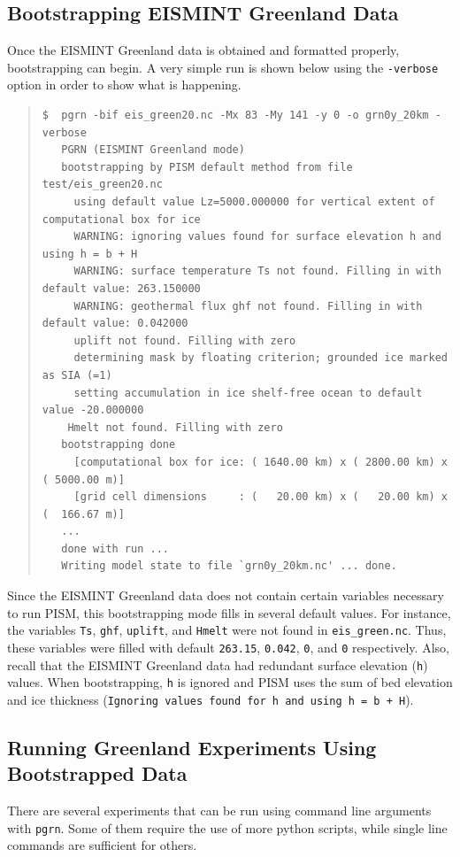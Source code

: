 \documentclass[11pt,final]{amsart}
\begin{document}
\subsection{Bootstrapping EISMINT Greenland Data}  Once the EISMINT Greenland data is obtained and formatted properly, bootstrapping can begin.  A very simple run is shown below using the \verb|-verbose| option in order to show what is happening.

\small\begin{quote}\begin{verbatim}
$  pgrn -bif eis_green20.nc -Mx 83 -My 141 -y 0 -o grn0y_20km -verbose
   PGRN (EISMINT Greenland mode)
   bootstrapping by PISM default method from file test/eis_green20.nc
     using default value Lz=5000.000000 for vertical extent of computational box for ice
     WARNING: ignoring values found for surface elevation h and using h = b + H
     WARNING: surface temperature Ts not found. Filling in with default value: 263.150000
     WARNING: geothermal flux ghf not found. Filling in with default value: 0.042000
     uplift not found. Filling with zero
     determining mask by floating criterion; grounded ice marked as SIA (=1)
     setting accumulation in ice shelf-free ocean to default value -20.000000
    Hmelt not found. Filling with zero
   bootstrapping done
     [computational box for ice: ( 1640.00 km) x ( 2800.00 km) x ( 5000.00 m)]
     [grid cell dimensions     : (   20.00 km) x (   20.00 km) x (  166.67 m)]
   ...
   done with run ... 
   Writing model state to file `grn0y_20km.nc' ... done.

\end{verbatim}
\end{quote}\normalsize

\noindent Since the EISMINT Greenland data does not contain certain variables necessary to run PISM, this bootstrapping mode fills in several default values. For instance, the variables \verb|Ts|, \verb|ghf|, \verb|uplift|, and \verb|Hmelt| were not found in \verb|eis_green.nc|. Thus, these variables were filled with default \verb|263.15|, \verb|0.042|, \verb|0|, and \verb|0| respectively. Also, recall that the EISMINT Greenland data had redundant surface elevation (\verb|h|) values. When bootstrapping, \verb|h| is ignored and PISM uses the sum of bed elevation and ice thickness (\verb|Ignoring values found for h and using h = b + H|).

\subsection{Running Greenland Experiments Using Bootstrapped Data}  There are several experiments that can be run using command line arguments with \verb|pgrn|. Some of them require the use of more python scripts, while single line commands are sufficient for others.
\end{document}
